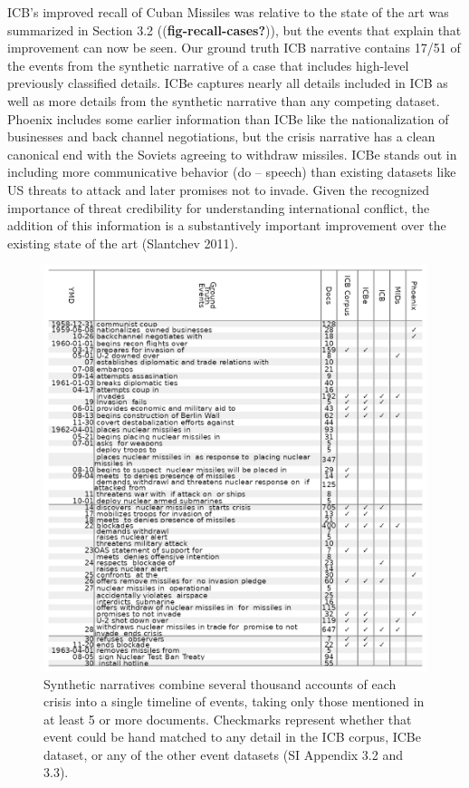 \documentclass{article}
\begin{document}
ICB's improved recall of Cuban Missiles was relative to the state of the
art was summarized in Section 3.2 ((\textbf{fig-recall-cases?})), but
the events that explain that improvement can now be seen. Our ground
truth ICB narrative contains 17/51 of the events from the synthetic
narrative of a case that includes high-level previously classified
details. ICBe captures nearly all details included in ICB as well as
more details from the synthetic narrative than any competing dataset.
Phoenix includes some earlier information than ICBe like the
nationalization of businesses and back channel negotiations, but the
crisis narrative has a clean canonical end with the Soviets agreeing to
withdraw missiles. ICBe stands out in including more communicative
behavior (do -- speech) than existing datasets like US threats to attack
and later promises not to invade. Given the recognized importance of
threat credibility for understanding international conflict, the
addition of this information is a substantively important improvement
over the existing state of the art (Slantchev 2011).

\begin{figure}
\hypertarget{fig-recall-cuba}{%
\centering
\includegraphics{case_study_cuban_recall.png}
\caption{Synthetic narratives combine several thousand accounts of each
crisis into a single timeline of events, taking only those mentioned in
at least 5 or more documents. Checkmarks represent whether that event
could be hand matched to any detail in the ICB corpus, ICBe dataset, or
any of the other event datasets (SI Appendix 3.2 and
3.3).}\label{fig-recall-cuba}
}
\end{figure}
\end{document}
